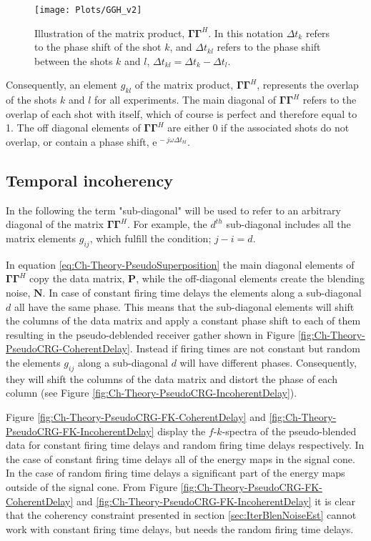 \begin{figure}
	\centering
	\texttt{[image: Plots/GGH\_v2]}
	\caption{Illustration of the matrix product, $\mathbf{\Gamma \Gamma}^H$. In this notation $\Delta t_k$ refers to the phase shift of the shot $k$, and $\Delta t_{kl}$ refers to the phase shift between the shots $k$ and $l$, $\Delta t_{kl} = \Delta t_k - \Delta t_l$.}
	\label{fig:Ch-Theory-GGH}
\end{figure}

Consequently, an element $g_{kl}$ of the matrix product, $\mathbf{\Gamma \Gamma}^H$, represents the overlap of the shots $k$ and $l$ for all experiments. The main diagonal of $\mathbf{\Gamma \Gamma}^H$ refers to the overlap of each shot with itself, which of course is perfect and therefore equal to 1. The off diagonal elements of $\mathbf{\Gamma \Gamma}^H$ are either 0 if the associated shots do not overlap, or contain a phase shift, $\mathrm{e}^{\, -j \omega \Delta t_{kl}}$.

\subsection*{Temporal incoherency}

In the following the term "sub-diagonal" will be used to refer to an arbitrary diagonal of the matrix $\mathbf{\Gamma \Gamma}^H$. For example, the $d^{th}$ sub-diagonal includes all the matrix elements $g_{ij}$, which fulfill the condition; $j -i = d$.

In equation \ref{eq:Ch-Theory-PseudoSuperposition} the main diagonal elements of $\mathbf{\Gamma \Gamma}^H$ copy the data matrix, $\mathbf{P}$, while the off-diagonal elements create the blending noise, $\mathbf{N}$. In case of constant firing time delays the elements along a sub-diagonal $d$ all have the same phase. This means that the sub-diagonal elements will shift the columns of the data matrix and apply a constant phase shift to each of them resulting in the pseudo-deblended receiver gather shown in Figure \ref{fig:Ch-Theory-PseudoCRG-CoherentDelay}. Instead if firing times are not constant but random the elements $g_{ij}$ along a sub-diagonal $d$ will have different phases. Consequently, they will shift the columns of the data matrix and distort the phase of each column (see Figure \ref{fig:Ch-Theory-PseudoCRG-IncoherentDelay}). 

Figure \ref{fig:Ch-Theory-PseudoCRG-FK-CoherentDelay} and \ref{fig:Ch-Theory-PseudoCRG-FK-IncoherentDelay} display the $f$-$k$-spectra of the pseudo-blended data for constant firing time delays and random firing time delays respectively. In the case of constant firing time delays all of the energy maps in the signal cone. In the case of random firing time delays a significant part of the energy maps outside of the signal cone. From Figure \ref{fig:Ch-Theory-PseudoCRG-FK-CoherentDelay} and \ref{fig:Ch-Theory-PseudoCRG-FK-IncoherentDelay} it is clear that the coherency constraint presented in section \ref{sec:IterBlenNoiseEst} cannot work with constant firing time delays, but needs the random firing time delays. 

